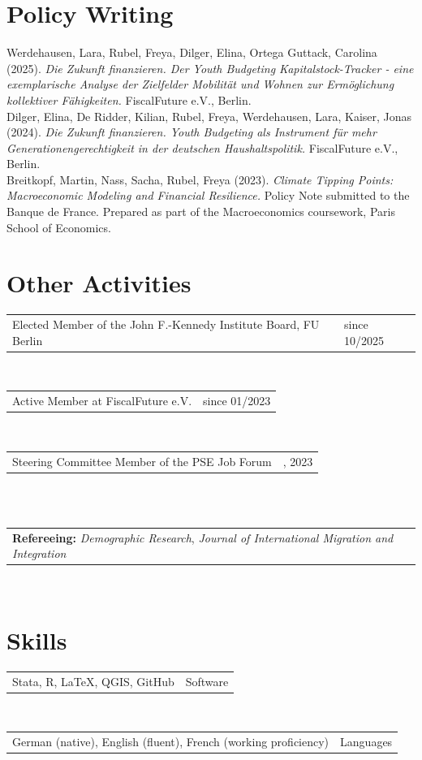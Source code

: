 \documentclass[10pt,a4paper]{article}
\makeatletter
\newlength{\datecolwidth}
\newlength{\contentcolwidth}
\newcommand{\cvitem}[2]{%
  \begin{tabular}{@{} p{\contentcolwidth} >{\raggedleft\arraybackslash}p{\datecolwidth} @{}}
    #2 & #1
  \end{tabular}\\[0.05em]
}
\makeatother
\begin{document}
\section{\large Policy Writing}

\begin{small}
Werdehausen, Lara, Rubel, Freya, Dilger, Elina, Ortega Guttack, Carolina (2025). \textit{Die Zukunft finanzieren. Der Youth Budgeting Kapitalstock-Tracker - eine exemplarische Analyse der Zielfelder Mobilität und Wohnen zur Ermöglichung kollektiver Fähigkeiten.} FiscalFuture e.V., Berlin. \vspace{0.18cm} \\
Dilger, Elina, De Ridder, Kilian, Rubel, Freya, Werdehausen, Lara, Kaiser, Jonas (2024). \textit{Die Zukunft finanzieren. Youth Budgeting als Instrument für mehr Generationengerechtigkeit in der deutschen Haushaltspolitik.} FiscalFuture e.V., Berlin. \vspace{0.18cm} \\
Breitkopf, Martin, Nass, Sacha, Rubel, Freya (2023). \textit{Climate Tipping Points: Macroeconomic Modeling and Financial Resilience.} Policy Note submitted to the Banque de France. Prepared as part of the Macroeconomics coursework, Paris School of Economics. \\
\end{small}


\section{\large Other Activities}

\cvitem{since 10/2025}{Elected Member of the John F.-Kennedy Institute Board, FU Berlin}
\cvitem{since 01/2023}{Active Member at FiscalFuture e.V.}
\cvitem{2022, 2023}{Steering Committee Member of the PSE Job Forum}\\[0.05cm]
\cvitem{}{\textbf{Refereeing:} \textit{Demographic Research}, \textit{Journal of International Migration and Integration} }

\section{\large Skills}

\cvitem{Software}{Stata, R, \LaTeX, QGIS, GitHub}
\cvitem{Languages}{German (native), English (fluent), French (working proficiency)}
\end{document}
